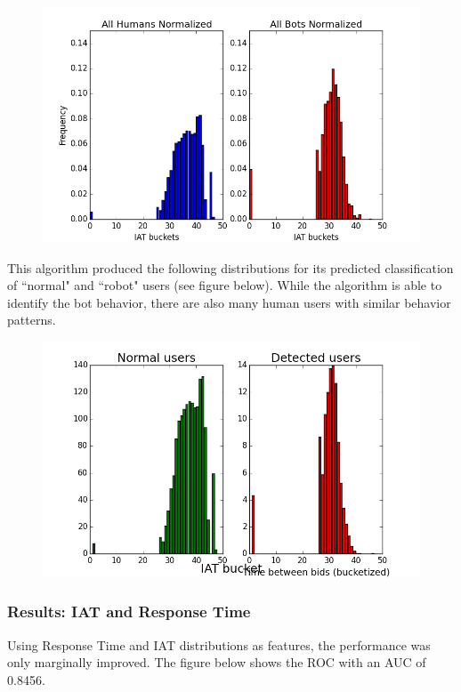 \documentclass{article} %
\begin{document}
\begin{figure}[h]
\centering
{\includegraphics[scale=0.5]{img/bird_iat_dist.png}}
\end{figure}

This algorithm produced the following distributions for its predicted classification of ``normal" and ``robot" users (see figure below).
While the algorithm is able to identify the bot behavior, there are also many human users with similar behavior patterns.

\begin{figure}[h]
\centering
{\includegraphics[scale=0.5]{img/bird_iat_pred.png}}
\end{figure}

\subsubsection{Results: IAT and Response Time}

Using Response Time and IAT distributions as features, the performance was only marginally improved.
The figure below shows the ROC with an AUC of 0.8456.
\end{document}
